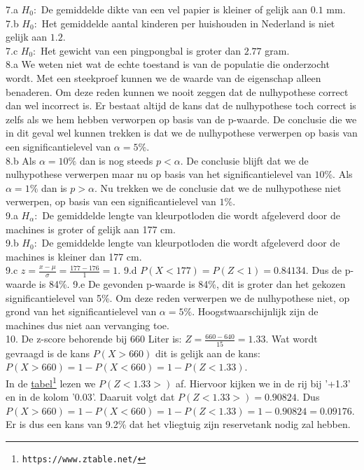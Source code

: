 7.a $H_0:$ De gemiddelde dikte van een vel papier is kleiner of gelijk aan $0.1$ mm.\\
7.b $H_0:$ Het gemiddelde aantal kinderen per huishouden in Nederland is niet gelijk aan $1.2$.\\
7.c  $H_0:$ Het gewicht van een pingpongbal is groter dan $2.77$ gram.\\


8.a We weten niet wat de echte toestand is van de populatie die onderzocht wordt. Met een steekproef kunnen we de waarde van de eigenschap alleen benaderen. Om deze reden kunnen we nooit zeggen dat de nulhypothese correct dan wel incorrect is. Er bestaat altijd de kans dat de nulhypothese toch correct is zelfs als we hem hebben verworpen op basis van de p-waarde. De conclusie die we in dit geval wel kunnen trekken is dat we de nulhypothese verwerpen op basis van een significantielevel van $\alpha=5\%$.\\
8.b Als $\alpha=10\%$ dan is nog steeds $p<\alpha$. De conclusie blijft dat we de nulhypothese verwerpen maar nu op basis van het significantielevel van $10\%$. Als $\alpha=1\%$ dan is $p>\alpha$. Nu trekken we de conclusie dat we de nulhypothese niet verwerpen, op basis van een significantielevel van $1\%$.\\


9.a $H_{\alpha}:$ De gemiddelde lengte van kleurpotloden die wordt afgeleverd door de machines is groter of gelijk aan 177 cm.\\
9.b $H_{0}:$ De gemiddelde lengte van kleurpotloden die wordt afgeleverd door de machines is kleiner dan 177 cm.\\
9.c $z=\frac{x-\mu}{\sigma} = \frac{177-176}{1} = 1$.
9.d $P(X< 177) = P(Z< 1) = 0.84134$. Dus de p-waarde is 84\%.
9.e De gevonden p-waarde is 84\%, dit is groter dan het gekozen significantielevel van 5\%. Om deze reden verwerpen we de nulhypothese niet, op grond van het significantielevel van $\alpha=5\%$. Hoogstwaarschijnlijk zijn de machines dus niet aan vervanging toe.\\


10. De z-score behorende bij 660 Liter is: $Z=\frac{660-640}{15} = 1.33$. Wat wordt gevraagd is de kans $P(X>660)$ dit is gelijk aan de kans:
$P(X>660)= 1-P(X< 660) = 1-P(Z<1.33)$.\\
In de \href{https://www.ztable.net/}{\color{blue}tabel}\footnote{\texttt{https://www.ztable.net/}} lezen we $P(Z<1.33>)$ af. Hiervoor kijken we in de rij bij '+1.3' en in de kolom '0.03'. Daaruit volgt dat
$P(Z<1.33>) = 0.90824$. Dus 
$P(X>660) = 1-P(X< 660) = 1-P(Z<1.33) = 1-0.90824 = 0.09176$.\\
Er is dus een kans van 9.2\% dat het vliegtuig zijn reservetank nodig zal hebben.








